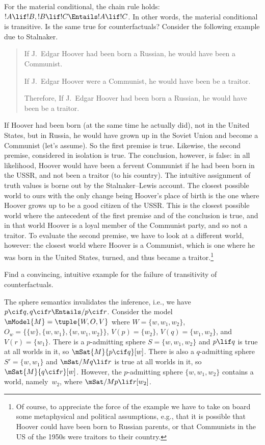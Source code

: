 \documentclass[../../../include/open-logic-section]{subfiles}
\begin{document}

For the material conditional, the chain rule holds: $!A \lif !B, !B
\lif !C \Entails !A \lif !C$. In other words, the material conditional
is transitive. Is the same true for counterfactuals? Consider the
following example due to Stalnaker.
\begin{quote}
  If J.~Edgar Hoover had been born a Russian, he would have been a Communist.

  If J.~Edgar Hoover were a Communist, he would have been be a traitor.

  Therefore, If J.~Edgar Hoover had been born a Russian, he would have
  been be a traitor.
\end{quote}
If Hoover had been born (at the same time he actually did), not in the
United States, but in Russia, he would have grown up in the Soviet
Union and become a Communist (let's assume). So the first premise is
true. Likewise, the second premise, considered in isolation is
true. The conclusion, however, is false: in all likelihood, Hoover
would have been a fervent Communist if he had been born in the USSR,
and not been a traitor (to his country).  The intuitive assignment of
truth values is borne out by the Stalnaker--Lewis account. The closest
possible world to ours with the only change being Hoover's place of
birth is the one where Hoover grows up to be a good citizen of the
USSR. This is the closest possible world where the antecedent of the
first premise and of the conclusion is true, and in that world Hoover
is a loyal member of the Communist party, and so not a traitor. To
evaluate the second premise, we have to look at a different world,
however: the closest world where Hoover is a Communist, which is one
where he was born in the United States, turned, and thus became a
traitor.\footnote{Of course, to appreciate the force of the example we
  have to take on board some metaphysical and political assumptions,
  e.g., that it is possible that Hoover could have been born to
  Russian parents, or that Communists in the US of the 1950s were
  traitors to their country.}

\begin{prob}
  Find a convincing, intuitive example for the failure of transitivity
  of counterfactuals.
\end{prob}

\begin{ex}
  The sphere semantics invalidates the inference, i.e., we have $p
  \cif q, q \cif r \Entails/ p \cif r$. Consider the model $\mModel{M}
  = \tuple{W, O, V}$ where $W = \{w, w_1, w_2\}$, $O_w = \{\{w\}, \{w,
  w_1\}, \{w, w_1, w_2\}\}$, $V(p) = \{w_2\}$, $V(q) = \{w_1, w_2\}$,
  and $V(r) = \{w_1\}$. There is a $p$-admitting sphere $S = \{w, w_1,
  w_2\}$ and $p \lif q$ is true at all worlds in it, so $\mSat{M}{p
    \cif q}[w]$. There is also a $q$-admitting sphere $S' = \{w,
  w_1\}$ and $\mSat/{M}{q \lif r}$ is true at all worlds in it, so
  $\mSat{M}{q \cif r}[w]$. However, the $p$-admitting sphere $\{w,
  w_1, w_2\}$ contains a world, namely~$w_2$, where $\mSat/{M}{p \lif
    r}[w_2]$.
\end{ex}
\end{document}
